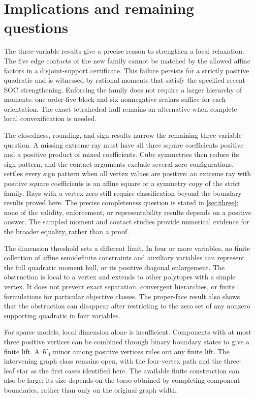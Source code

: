 \section{Implications and remaining questions}\label{sec:discussion}

The three-variable results give a precise reason to strengthen a local
relaxation. The five edge contacts of the new family cannot be matched by
the allowed affine factors in a disjoint-support certificate. This failure
persists for a strictly positive quadratic and is witnessed by rational
moments that satisfy the specified recent SOC strengthening. Enforcing
the family does not require a larger hierarchy of moments: one order-five
block and six nonnegative scalars suffice for each orientation. The exact
tetrahedral hull remains an alternative when complete local convexification
is needed.

The closedness, rounding, and sign results narrow the remaining
three-variable question. A missing extreme ray must have all three square
coefficients positive and a positive product of mixed coefficients.
Cube symmetries then reduce its sign pattern, and the contact arguments
exclude several zero configurations. 
settles every sign pattern when all vertex values are positive: an
extreme ray with positive square coefficients is an affine square or a
symmetry copy of the strict family. Rays with a vertex zero still require
classification beyond the boundary results proved here. The precise
completeness question is stated in \cref{sec:three}; none of the validity,
enforcement, or representability results depends on a positive answer.
The sampled moment and contact studies provide numerical evidence for
the broader equality, rather than a proof.

The dimension threshold sets a different limit. In four or more variables,
no finite collection of affine semidefinite constraints and auxiliary
variables can represent the full quadratic moment hull, or its positive
diagonal enlargement. The obstruction is local to a vertex and extends
to other polytopes with a simple vertex. It does not prevent exact
separation, convergent hierarchies, or finite formulations for particular
objective classes. The proper-face result also shows that the obstruction
can disappear after restricting to the zero set of any nonzero supporting
quadratic in four variables.

For sparse models, local dimension alone is insufficient. Components with
at most three positive vertices can be combined through binary boundary
states to give a finite lift. A $K_4$ minor among positive vertices rules
out any finite lift. The intervening graph class remains open, with the
four-vertex path and the three-leaf star as the first cases identified
here. The available finite construction can also be large: its size
depends on the torso obtained by completing component boundaries, rather
than only on the original graph width.

